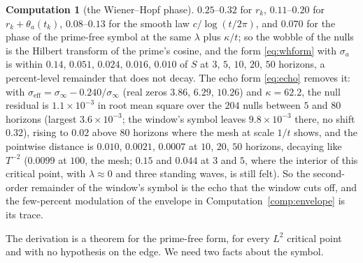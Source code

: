 \documentclass[11pt]{article}
\theoremstyle{definition}
\newtheorem{computation}[theorem]{Computation}
\theoremstyle{remark}
\begin{document}
\begin{computation}[the Wiener--Hopf phase]
$0.25$--$0.32$ for $r_k$, $0.11$--$0.20$ for $r_k+\theta_a(t_k)$, $0.08$--$0.13$ for the smooth law $c/\log(t/2\pi)$, and $0.070$ for the phase of the prime-free symbol at the same $\lambda$ plus $\kappa/t$; so the wobble of the nulls is the Hilbert transform of the prime's cosine, and the form \eqref{eq:whform} with $\sigma_a$ is within $0.14$, $0.051$, $0.024$, $0.016$, $0.010$ of $S$ at $3$, $5$, $10$, $20$, $50$ horizons, a percent-level remainder that does not decay. The echo form \eqref{eq:echo} removes it: with $\sigma_{\mathrm{eff}}=\sigma_\infty-0.240/\sigma_\infty$ (real zeros $3.86$, $6.29$, $10.26$) and $\kappa=62.2$, the null residual is $1.1\times10^{-3}$ in root mean square over the $204$ nulls between $5$ and $80$ horizons (largest $3.6\times10^{-3}$; the window's symbol leaves $9.8\times10^{-3}$ there, no shift $0.32$), rising to $0.02$ above $80$ horizons where the mesh at scale $1/t$ shows, and the pointwise distance is $0.010$, $0.0021$, $0.0007$ at $10$, $20$, $50$ horizons, decaying like $T^{-2}$ ($0.0099$ at $100$, the mesh; $0.15$ and $0.044$ at $3$ and $5$, where the interior of this critical point, with $\lambda\approx0$ and three standing waves, is still felt). So the second-order remainder of the window's symbol is the echo that the window cuts off, and the few-percent modulation of the envelope in Computation~\ref{comp:envelope} is its trace.
\end{computation}

The derivation is a theorem for the prime-free form, for every $L^2$ critical point and with no hypothesis on the edge. We need two facts about the symbol.
\end{document}
